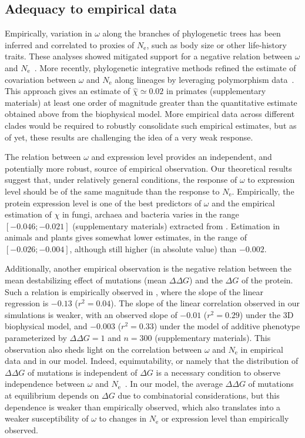 \documentclass[authoryear]{elsarticle} %
\newcommand{\Ne}{N_{\text{e}}} %
\newcommand{\NbrSites}{n} %
\newcommand{\G}{G} %
\newcommand{\DeltaG}{\Delta \G} %
\newcommand{\EmpiricalDeltaDeltaG}{\Delta \DeltaG} %
\begin{document}
\subsection{Adequacy to empirical data}
Empirically, variation in $\omega$ along the branches of phylogenetic trees has been inferred and correlated to proxies of $\Ne$, such as body size or other life-history traits.
These analyses showed mitigated support for a negative relation between $\omega$ and $\Ne$~\citep{Lanfear2014}.
More recently, phylogenetic integrative methods refined the estimate of covariation between $\omega$ and $\Ne$ along lineages by leveraging polymorphism data~\citep{Brevet2019}.
This approach gives an estimate of $\hat{\chi} \simeq 0.02$ in primates (supplementary materials) at least one order of magnitude greater than the quantitative estimate obtained above from the biophysical model.
More empirical data across different clades would be required to robustly consolidate such empirical estimates, but as of yet, these results are challenging the idea of a very weak response.

The relation between $\omega$ and expression level provides an independent, and potentially more robust, source of empirical observation.
Our theoretical results suggest that, under relatively general conditions, the response of $\omega$ to expression level should be of the same magnitude than the response to $\Ne$.
Empirically, the protein expression level is one of the best predictors of $\omega$ and the empirical estimation of $\chi$ in fungi, archaea and bacteria varies in the range $[-0.046;-0.021]$ (supplementary materials) extracted from \citet{Zhang2015}.
Estimation in animals and plants gives somewhat lower estimates, in the range of $[-0.026;-0.004]$, although still higher (in absolute value) than $-0.002$.

Additionally, another empirical observation is the negative relation between the mean destabilizing effect of mutations (mean $\EmpiricalDeltaDeltaG$) and the $\DeltaG$ of the protein.
Such a relation is empirically observed in \citet{Serohijos2012}, where the slope of the linear regression is $-0.13$ ($r^2=0.04$).
The slope of the linear correlation observed in our simulations is weaker, with an observed slope of $-0.01$ ($r^2=0.29$) under the 3D biophysical model, and $-0.003$ ($r^2=0.33$) under the model of additive {phenotype} parameterized by $\EmpiricalDeltaDeltaG = 1$ and $\NbrSites=300$ (supplementary materials).
This observation also sheds light on the correlation between $\omega$ and $\Ne$ in empirical data and in our model.
Indeed, equimutability, or namely that the distribution of $\EmpiricalDeltaDeltaG$ of mutations is independent of $\DeltaG$ is a necessary condition to observe independence between $\omega$ and $\Ne$~\citep{Cherry1998}.
In our model, the average $\EmpiricalDeltaDeltaG$ of mutations at equilibrium depends on $\DeltaG$ due to combinatorial considerations, but this dependence is weaker than empirically observed, which also translates into a weaker susceptibility of $\omega$ to changes in $\Ne$ or expression level than empirically observed.
\end{document}
